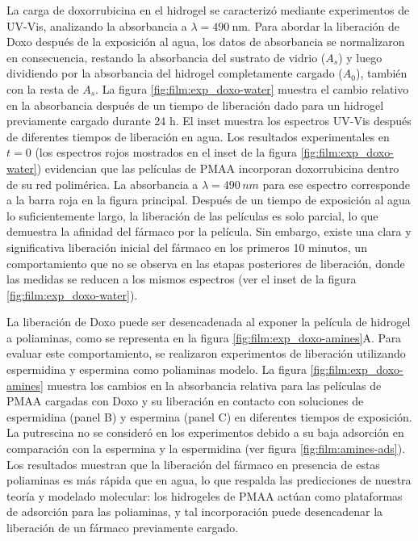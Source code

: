 La carga de doxorrubicina en el hidrogel se caracteriz\'o mediante experimentos de UV-Vis, analizando la absorbancia a $\lambda=490\:$nm. Para abordar la liberaci\'on de Doxo despu\'es de la exposici\'on al agua, los datos de absorbancia se normalizaron en consecuencia, restando la absorbancia del sustrato de vidrio ($A_s$) y luego dividiendo por la absorbancia del hidrogel completamente cargado ($A_0$), tambi\'en con la resta de $A_s$. La figura \ref{fig:film:exp_doxo-water} muestra el cambio relativo en la absorbancia despu\'es de un tiempo de liberaci\'on dado para un hidrogel previamente cargado durante 24 h. El inset muestra los espectros UV-Vis despu\'es de diferentes tiempos de liberaci\'on en agua. Los resultados experimentales en $t=0$ (los espectros rojos mostrados en el inset de la figura \ref{fig:film:exp_doxo-water}) evidencian que las pel\'iculas de PMAA incorporan doxorrubicina dentro de su red polim\'erica. La absorbancia a $\lambda=490\, nm$ para ese espectro corresponde a la barra roja en la figura principal. Despu\'es de un tiempo de exposici\'on al agua lo suficientemente largo, la liberaci\'on de las pel\'iculas es solo parcial, lo que demuestra la afinidad del f\'armaco por la pel\'icula. Sin embargo, existe una clara y significativa liberaci\'on inicial del f\'armaco en los primeros 10 minutos, un comportamiento que no se observa en las etapas posteriores de liberaci\'on, donde las medidas se reducen a los mismos espectros (ver el inset de la figura \ref{fig:film:exp_doxo-water}).


La liberaci\'on de Doxo puede ser desencadenada al exponer la pel\'icula de hidrogel a poliaminas, como se representa en la figura \ref{fig:film:exp_doxo-amines}A. Para evaluar este comportamiento, se realizaron experimentos de liberaci\'on utilizando espermidina y espermina como poliaminas modelo. La  figura \ref{fig:film:exp_doxo-amines} muestra los cambios en la absorbancia relativa para las pel\'iculas de PMAA cargadas con Doxo y su liberaci\'on en contacto con soluciones de espermidina (panel B) y espermina (panel C) en diferentes tiempos de exposici\'on. La putrescina no se consider\'o en los experimentos debido a su baja adsorci\'on en comparaci\'on con la espermina y la espermidina (ver figura \ref{fig:film:amines-ads}). Los resultados muestran que la liberaci\'on del f\'armaco en presencia de estas poliaminas es m\'as r\'apida que en agua, lo que respalda las predicciones de nuestra teor\'ia y modelado molecular: los hidrogeles de PMAA act\'uan como plataformas de adsorci\'on para las poliaminas, y tal incorporaci\'on puede desencadenar la liberaci\'on de un f\'armaco previamente cargado.




